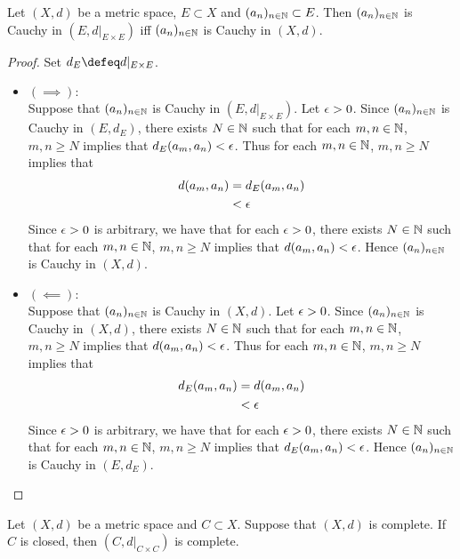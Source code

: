 \documentclass{book}
\begin{document}
\begin{ex} 
	Let $(X, d)$ be a metric space, $E \subset X$ and $(a_n)_{n \in \mathbb{N}} \subset E$. Then $(a_n)_{n \in \mathbb{N}}$ is Cauchy in $(E, d|_{E \times E})$ iff $(a_n)_{n \in \mathbb{N}}$ is Cauchy in $(X, d)$.  
\end{ex}

\begin{proof}
	Set $d_E \defeq d|_{E \times E}$.
	\begin{itemize}
		\item $(\implies):$ \\
		Suppose that $(a_n)_{n \in \mathbb{N}}$ is Cauchy in $(E, d|_{E \times E})$. Let $\epsilon > 0$. Since $(a_n)_{n \in \mathbb{N}}$ is Cauchy in $(E, d_E)$, there exists $N \in \mathbb{N}$ such that for each $m,n \in \mathbb{N}$, $m,n \geq N$ implies that $d_E(a_m, a_n) < \epsilon$. Thus for each $m,n \in \mathbb{N}$, $m,n \geq N$ implies that
		\begin{align*}
			d(a_m, a_n)
			& = d_E(a_m, a_n) \\
			& < \epsilon 
		\end{align*}
		Since $\epsilon > 0 $ is arbitrary, we have that for each $\epsilon > 0$, there exists $N \in \mathbb{N}$ such that for each $m,n \in \mathbb{N}$, $m,n \geq N$ implies that $d(a_m, a_n) < \epsilon$. Hence $(a_n)_{n \in \mathbb{N}}$ is Cauchy in $(X, d)$.
		\item $(\impliedby):$ \\
		Suppose that $(a_n)_{n \in \mathbb{N}}$ is Cauchy in $(X, d)$. Let $\epsilon > 0$. Since $(a_n)_{n \in \mathbb{N}}$ is Cauchy in $(X, d)$, there exists $N \in \mathbb{N}$ such that for each $m,n \in \mathbb{N}$, $m,n \geq N$ implies that $d(a_m, a_n) < \epsilon$. Thus for each $m,n \in \mathbb{N}$, $m,n \geq N$ implies that
		\begin{align*}
			d_E(a_m, a_n)
			& = d(a_m, a_n) \\
			& < \epsilon 
		\end{align*}
		Since $\epsilon > 0 $ is arbitrary, we have that for each $\epsilon > 0$, there exists $N \in \mathbb{N}$ such that for each $m,n \in \mathbb{N}$, $m,n \geq N$ implies that $d_E(a_m, a_n) < \epsilon$. Hence $(a_n)_{n \in \mathbb{N}}$ is Cauchy in $(E, d_E)$.
	\end{itemize}
\end{proof}

\begin{ex} 
	Let $(X, d)$ be a metric space and $C \subset X$. Suppose that $(X, d)$ is complete. If $C$ is closed, then $(C, d|_{C \times C})$ is complete. 
\end{ex}
\end{document}
